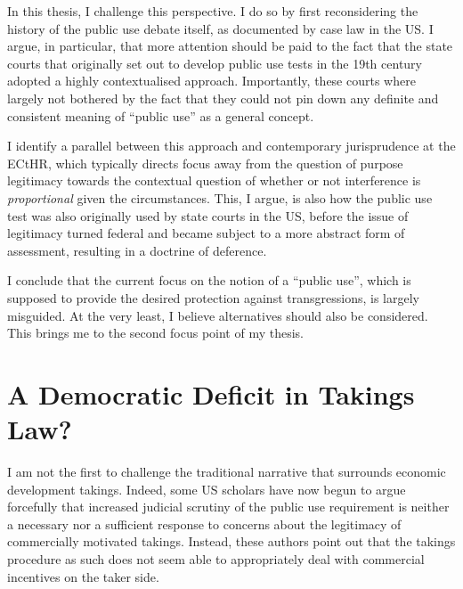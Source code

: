 \documentclass{book} %
\newcommand{\noo}[1]{}
\begin{document}
In this thesis, I challenge this perspective. I do so by first reconsidering the history of the public use debate itself, as documented by case law in the US. I argue, in particular, that more attention should be paid to the fact that the state courts that originally set out to develop public use tests in the 19th century adopted a highly contextualised approach. Importantly, these courts where largely not bothered by the fact that they could not pin down any definite and consistent meaning of ``public use'' as a general concept. 

\noo{ Rather, the public use test was simply used as an expedient way of subjecting various acts of taking to a concrete fairness assessment, in the hope that local courts might help deliver corrective justice in cases when the takings power appeared to have been used in an objectionable manner. In this way, the original purpose of the public use test was tailored towards setting up a framework for judicial review that appears quite similar to how the European Court of Human Rights (ECtHR) currently choose to approach cases dealing with property.}

I identify a parallel between this approach and contemporary jurisprudence at the ECtHR, which typically directs focus away from the question of purpose legitimacy towards the contextual question of whether or not interference is {\it proportional} given the circumstances. This, I argue, is also how the public use test was also originally used by state courts in the US, before the issue of legitimacy turned federal and became subject to a more abstract form of assessment, resulting in a doctrine of deference.

I conclude that the current focus on the notion of a ``public use'', which is supposed to provide the desired protection against transgressions, is largely misguided. At the very least, I believe alternatives should also be considered. This brings me to the second focus point of my thesis.

\section{A Democratic Deficit in Takings Law?}

I am not the first to challenge the traditional narrative that surrounds economic development takings. Indeed, some US scholars have now begun to argue forcefully that increased judicial scrutiny of the public use requirement is neither a necessary nor a sufficient response to concerns about the legitimacy of commercially motivated takings. Instead, these authors point out that the takings procedure as such does not seem able to appropriately deal with commercial incentives on the taker side.
\end{document}
